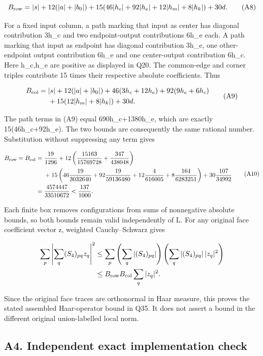 \documentclass[11pt]{article}
\begin{document}
\[
 B_{\rm row}=|s|+12(|a|+|b_0|)
 +15(46|h_c|+92|h_e|+12|h_m|+8|h_k|)+30d. \tag{A8}
\]

For a fixed input column, a path marking that input as center has diagonal contribution 3h\_c and two endpoint-output contributions 6h\_e each. A path marking that input as endpoint has diagonal contribution 3h\_e, one other-endpoint output contribution 6h\_e and one center-output contribution 6h\_c. Here h\_c,h\_e are positive as displayed in Q20. The common-edge and corner triples contribute 15 times their respective absolute coefficients. Thus

\[
\begin{aligned}
 B_{\rm col}={}&|s|+12(|a|+|b_0|)
 +46(3h_c+12h_e)+92(9h_e+6h_c)\\
 &+15(12|h_m|+8|h_k|)+30d.
\end{aligned} \tag{A9}
\]

The path terms in (A9) equal 690h\_c+1380h\_e, which are exactly 15(46h\_c+92h\_e). The two bounds are consequently the same rational number. Substitution without suppressing any term gives

\[
\begin{aligned}
 B_{\rm row}=B_{\rm col}
 ={}&\frac{19}{1296}
 +12\left(\frac{15163}{15769728}+\frac{347}{438048}\right)\\
 &+15\left(46\frac{19}{3032640}+92\frac{19}{59136480}
 +12\frac4{616005}+8\frac{164}{6283251}\right)
 +30\frac{107}{34992}\\
 ={}&\frac{4574447}{33510672}<\frac{137}{1000}.
\end{aligned} \tag{A10}
\]

Each finite box removes configurations from sums of nonnegative absolute bounds, so both bounds remain valid independently of L. For any original face coefficient vector z, weighted Cauchy--Schwarz gives

\[
\begin{aligned}
 \sum_p\left|\sum_q(S_4)_{pq}z_q\right|^2
 &\le\sum_p\left(\sum_q|(S_4)_{pq}|\right)
             \left(\sum_q|(S_4)_{pq}|\,|z_q|^2\right)\\
 &\le B_{\rm row}B_{\rm col}\sum_q|z_q|^2.
\end{aligned}
\]

Since the original face traces are orthonormal in Haar measure, this proves the stated assembled Haar-operator bound in Q35. It does not assert a bound in the different original union-labelled local norm.

\subsection*{A4. Independent exact implementation check}
\end{document}
